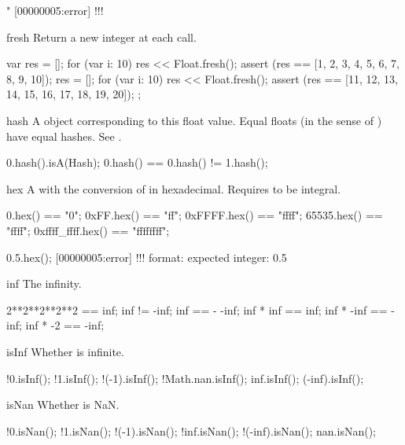 \begin{urbiscriptapi}
\begin{urbiassert}
"%
[00000005:error] !!! %
\end{urbiassert}


\item[fresh]%
  Return a new integer at each call.
\begin{urbiscript}
{
  var res = [];
  for (var i: 10)
    res << Float.fresh();
  assert (res == [1, 2, 3, 4, 5, 6, 7, 8, 9, 10]);
  res = [];
  for (var i: 10)
    res << Float.fresh();
  assert (res == [11, 12, 13, 14, 15, 16, 17, 18, 19, 20]);
};
\end{urbiscript}


\item[hash] A  object corresponding to this float value.
  Equal floats (in the sense of ) have equal hashes.  See
  .

\begin{urbiassert}
0.hash().isA(Hash);
0.hash() == 0.hash() != 1.hash();
\end{urbiassert}



\item[hex] A  with the conversion of \this in hexadecimal.
  Requires \this to be integral.
\begin{urbiassert}
          0.hex() == "0";
       0xFF.hex() == "ff";
     0xFFFF.hex() == "ffff";
      65535.hex() == "ffff";
0xffff_ffff.hex() == "ffffffff";

0.5.hex();
[00000005:error] !!! format: expected integer: 0.5
\end{urbiassert}


\item[inf]
  The infinity.
\begin{urbiassert}
2**2**2**2**2 == inf;
inf != -inf;
inf == - -inf;
inf * inf == inf;
inf * -inf == -inf;
inf * -2 == -inf;
\end{urbiassert}


\item[isInf]%
  Whether \this is infinite.
\begin{urbiassert}
    !0.isInf(); !1.isInf(); !(-1).isInf();
  !Math.nan.isInf();
   inf.isInf();  (-inf).isInf();
\end{urbiassert}


\item[isNan]%
  Whether is NaN.
\begin{urbiassert}
     !0.isNan(); !1.isNan(); !(-1).isNan();
   !inf.isNan();  !(-inf).isNan();
    nan.isNan();
\end{urbiassert}



\end{urbiscriptapi}

